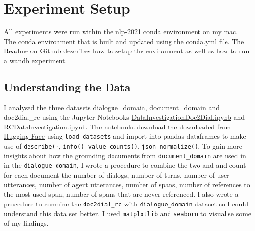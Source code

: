 \documentclass[11pt]{article}
\begin{document}
%
%


    \section{Experiment Setup}\label{sec:experiment-setup}

    All experiments were run within the nlp-2021 conda environment on my mac. The conda environment that is built and updated using the
    \href{https://github.com/isabelladegen/nlp-2021/blob/main/conda.yml}{conda.yml} file. The
    \href{https://github.com/isabelladegen/nlp-2021}{Readme} on Github describes how to setup the environment as well
    as how to run a wandb experiment.

    \subsection{Understanding the Data}\label{subsec:understanding-the-data-experiment}
    I analysed the three datasets dialogue\_domain, document\_domain and doc2dial\_rc using the Jupyter Notebooks
    \href{https://github.com/isabelladegen/nlp-2021/blob/main/notebooks/DataInvestigationDoc2Dial.ipynb}{DataInvestigationDoc2Dial.ipynb}
    and \href{https://github.com/isabelladegen/nlp-2021/blob/main/notebooks/RCDataInvestigation.ipynb}{RCDataInvestigation.ipynb}.
    The notebooks download the downloaded from \href{https://huggingface.co/datasets/doc2dial}{Hugging Face}
    using \texttt{load\_datasets} and import into pandas dataframes \cite{reback2020pandas} to make use of
    \texttt{describe()}, \texttt{info()}, \texttt{value\_counts()}, \texttt{json\_normalize()}. To gain more insights
    about how the grounding documents from \texttt{document\_domain} are used in in the \texttt{dialogue\_domain},
    I wrote a procedure to combine the two and and count for each document the number of dialogs, number of turns, number of user utterances,
    number of agent utterances, number of spans, number of references to the most used span, number of spans that are never referenced.
    I also wrote a procedure to combine the \texttt{doc2dial\_rc} with \texttt{dialogue\_domain} dataset so I could understand
    this data set better. I used \texttt{matplotlib} \cite{matplotlib} and \texttt{seaborn} \cite{seaborn} to visualise
    some of my findings.
\end{document}
